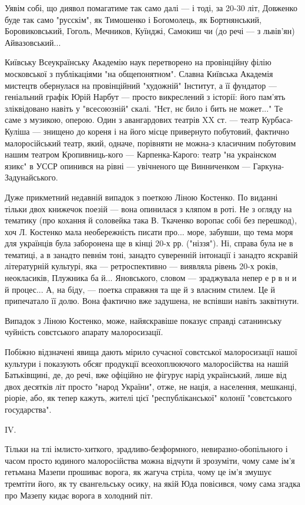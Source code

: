 Уявім собі, що диявол помагатиме так само далі — і тоді, за 20-30 літ, Довженко
буде так само "русскім", як Тимошенко і Богомолець, як Бортнянський,
Боровиковський, Гоголь, Мечников, Куїнджі, Самокиш чи (до речі — з львів'ян)
Айвазовський...

Київську Всеукраїнську Академію наук перетворено на провінційну філію
московської з публікаціями "на общепонятном". Славна Київська Академія мистецтв
обернулася на провінційний "художній" Інститут, а її фундатор — геніальний
графік Юрій Нарбут — просто викреслений з історії: його пам'ять зліквідовано
навіть у "всесоюзній" скалі. "Нєт, нє било і бить не может..." Те саме з
музикою, оперою. Один з авангардових театрів XX ст. — театр Курбаса-Куліша —
знищено до кореня і на його місце привернуто побутовий, фактично малоросійський
театр, який, одначе, порівняти не можна-з класичним побутовим нашим театром
Кропивниць-кого — Карпенка-Карого: театр "на украінском язикє" в УССР опинився
на рівні — увічненого ще Винниченком — Гаркуна-Задунайського.

Дуже прикметний недавній випадок з поеткою Ліною Костенко. По виданні тільки
двох книжечок поезій — вона опинилася з кляпом в роті. Не з огляду на тематику
(про кохання й соловейка така В. Ткаченко воропає собі без перешкод), хоч Л.
Костенко мала необережність писати про... море, забувши, що тема моря для
українців була заборонена ще в кінці 20-х рр. ("ніззя"). Ні, справа була не в
тематиці, а в занадто певнім тоні, занадто суверенній інтонації і занадто
яскравій літературній культурі, яка — ретроспективно — виявляла рівень 20-х
років, неокласиків, Плужника ба й... Яновського, словом — зраджувала непер е р
в н и й процес... А, на біду, — поетка справжня та ще й з власним стилем. Це й
припечатало її долю. Вона фактично вже задушена, не вспівши навіть заквітнути.

Випадок з Ліною Костенко, може, найяскравіше показує справді сатанинську чуйність совєтського апарату малоросизації.

Побіжно відзначені явища дають мірило сучасної совєтської малоросизації нашої
культури і показують обсяг продукції всеохоплюючого малоросійства на нашій
Батьківщині, де, до речі, вже офіційно не фігурує нарід український, лише від
двох десятків літ просто "народ України", отже, не нація, а населення,
мешканці, ріоріе, або, як тепер кажуть, жителі цієї "республіканської" колонії
"совєтського государства".

IV.

Тільки на тлі імлисто-хиткого, зрадливо-безформного, невиразно-обопільного і часом просто юдиного малоросійства можна відчути й зрозуміти, чому саме ім'я гетьмана Мазепи прошиває ворога, як жагуча стріла, чому це ім'я змушує тремтіти його, як ту євангельську осику, на якій Юда повісився, чому сама згадка про Мазепу кидає ворога в холодний піт.

